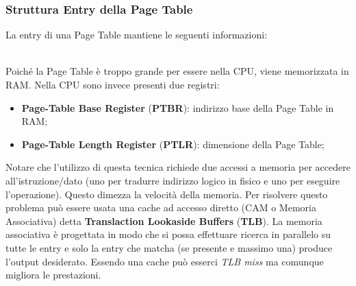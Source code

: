 \documentclass{article}
\begin{document}
			\subsubsection{Struttura Entry della Page Table}
				La entry di una Page Table mantiene le seguenti informazioni:
				\begin{figure}[ht!]
				\end{figure}
				\\Poiché la Page Table è troppo grande per essere nella CPU, viene memorizzata in RAM. Nella CPU sono invece presenti due registri:
				\begin{itemize}
					\item \textbf{Page-Table Base Register} (\textbf{PTBR}): indirizzo base della Page Table in RAM;
					\item \textbf{Page-Table Length Register} (\textbf{PTLR}): dimensione della Page Table;
				\end{itemize}
				Notare che l'utilizzo di questa tecnica richiede due accessi a memoria per accedere all'istruzione/dato (uno per tradurre indirizzo logico in fisico e uno per eseguire l'operazione). Questo dimezza la velocità della memoria. Per risolvere questo problema può essere usata una cache ad accesso diretto (CAM o Memoria Associativa) detta \textbf{Translaction Lookaside Buffers} (\textbf{TLB}). La memoria associativa è progettata in modo che si possa effettuare ricerca in parallelo su tutte le entry e solo la entry che matcha (se presente e massimo una) produce l'output desiderato. Essendo una cache può esserci \textit{TLB miss} ma comunque migliora le prestazioni. 
				\begin{figure}[ht!]
				\end{figure}
\end{document}
